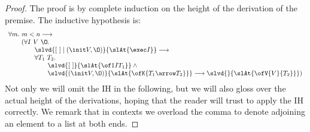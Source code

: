 \documentclass[final]{svjour3}
\begin{document}
\begin{proof}
 The proof is by complete induction on the height of the derivation of
the premise.  The inductive hypothesis  is:
$$
\begin{array}{l}
  \forall m.\ m < n \longrightarrow\\
\qquad  (\forall I\ V\ \O. \\
\qquad\qquad\slvd{\elist\coln(\init V, \O)}{\slAt{\exec I}}
\longrightarrow\\
\qquad\qquad\forall T_1\ T_2.\\
\qquad\qquad\qquad \slvd {\elist}{\slAt{\ofI I T_1}}\land\mbox{}\\
\qquad\qquad\qquad\slvd {(\init V, \O)}{\slAt{\ofK {T_1\arrow
      T_2}}}\longrightarrow \slvd{}{\slAt{\ofV{V}{T_2}}})
\end{array}
$$
Not only we will omit the IH in the following, but we will also gloss
over the actual height of the derivations, hoping that the reader will
trust \HOL to apply the IH correctly. We remark that  in contexts
we overload the comma to denote adjoining an element to a list at both
ends.


\end{proof}
\end{document}
